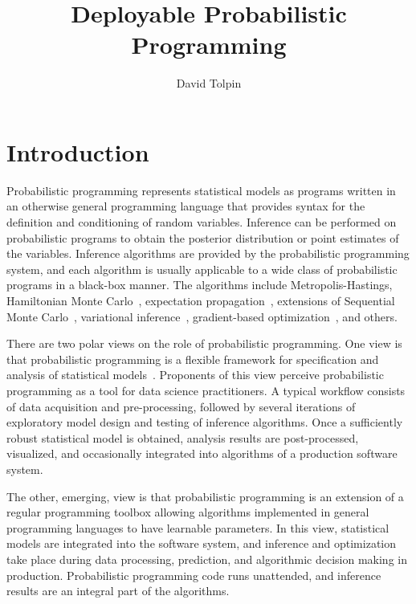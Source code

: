 \documentclass[sigplan,review,10pt,anonymous]{acmart}
\title{Deployable Probabilistic Programming}
\author{David Tolpin}
\affiliation{
    \institution{PUB+}
    \country{Israel}
}
\begin{document}
\maketitle

\begin{sloppypar}

\section{Introduction}

	Probabilistic programming \cite{GMR+08,MSP14,WVM14,GS15}
	represents statistical models as programs written in an
	otherwise general programming language that provides syntax
	for the definition and conditioning of random variables.
	Inference can be performed on probabilistic programs to
	obtain the posterior distribution or point estimates of the
	variables. Inference algorithms are provided by the
	probabilistic programming system, and each algorithm is
	usually applicable to a wide class of probabilistic programs
	in a black-box manner. The algorithms include
	Metropolis-Hastings\cite{WSG11,MSP14,YHG14}, Hamiltonian
	Monte Carlo~\cite{Stan17}, expectation
	propagation~\cite{MWG+10}, extensions of Sequential Monte
	Carlo~\cite{WVM14,MYM+15,PWD+14}, variational
	inference~\cite{WW13,KTR+17}, gradient-based
	optimization~\cite{Stan17,BCJ+19}, and others.

	There are two polar views on the role of probabilistic
	programming.  One view is that probabilistic programming is
	a flexible framework for specification and analysis of
	statistical models~\cite{WSG11,TMY+16,GXG18}. Proponents of
	this view perceive probabilistic programming as a tool for
	data science practitioners. A typical workflow consists of
	data acquisition and pre-processing, followed by several
	iterations of exploratory model design and testing of
	inference algorithms. Once a sufficiently robust statistical
	model is obtained, analysis results are post-processed,
	visualized, and occasionally integrated into algorithms of a
	production software system. 

	The other, emerging, view is that probabilistic programming
	is an extension of a regular programming toolbox allowing
	algorithms implemented in general programming languages to
	have learnable parameters. In this view, statistical models
	are integrated into the software system, and inference and
	optimization take place during data processing, prediction,
	and algorithmic decision making in production.
	Probabilistic programming code runs unattended, and
	inference results are an integral part of the algorithms.


\end{sloppypar}
\end{document}
